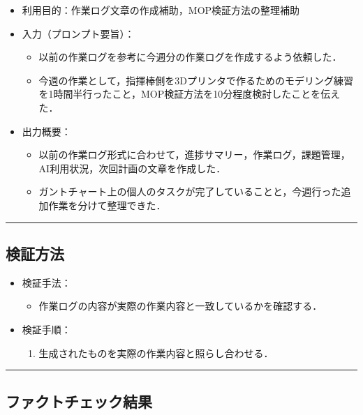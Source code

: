 \documentclass[uplatex,dvipdfmx,a4paper,11pt]{jsarticle}
\newcommand{\sectionrule}{\par\medskip\noindent\rule{\linewidth}{0.6pt}\par\medskip}
\begin{document}
\begin{itemize}
  \item 利用目的：作業ログ文章の作成補助，MOP検証方法の整理補助
  \item 入力（プロンプト要旨）：
    \begin{itemize}
      \item 以前の作業ログを参考に今週分の作業ログを作成するよう依頼した．
      \item 今週の作業として，指揮棒側を3Dプリンタで作るためのモデリング練習を1時間半行ったこと，MOP検証方法を10分程度検討したことを伝えた．
    \end{itemize}
  \item 出力概要：
    \begin{itemize}
      \item 以前の作業ログ形式に合わせて，進捗サマリー，作業ログ，課題管理，AI利用状況，次回計画の文章を作成した．
      \item ガントチャート上の個人のタスクが完了していることと，今週行った追加作業を分けて整理できた．
    \end{itemize}
\end{itemize}

\sectionrule

\subsection{検証方法}

\begin{itemize}
  \item 検証手法：
    \begin{itemize}
      \item 作業ログの内容が実際の作業内容と一致しているかを確認する．
    \end{itemize}
  \item 検証手順：
    \begin{enumerate}
      \item 生成されたものを実際の作業内容と照らし合わせる．
    \end{enumerate}
\end{itemize}

\sectionrule

\subsection{ファクトチェック結果}
\end{document}
